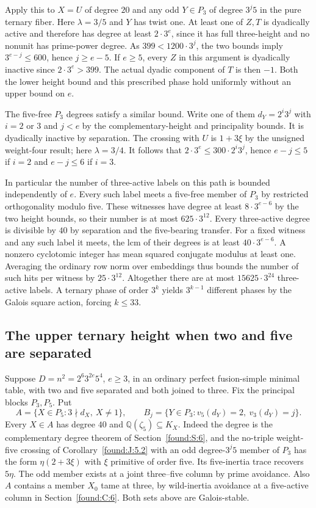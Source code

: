 \documentclass[11pt,a4paper]{article}
\numberwithin{equation}{section}
\theoremstyle{remark}
\newcommand{\QQ}{\mathbb Q}
\begin{document}
Apply this to $X=U$ of degree $20$ and any odd $Y\in P_3$ of
degree $3^j5$ in the pure ternary fiber. Here $\lambda=3/5$ and
$Y$ has twist one. At least one of $Z,T$ is dyadically active and
therefore has degree at least $2\cdot3^e$, since it has full
three-height and no nonunit has prime-power degree. As
$399<1200\cdot3^j$, the two bounds imply
$3^{e-j}\le600$, hence $j\ge e-5$.
If $e\ge5$, every $Z$ in this argument is dyadically inactive
since $2\cdot3^e>399$. The actual dyadic component of $T$ is
then $-1$. Both the lower height bound and this prescribed phase
hold uniformly without an upper bound on $e$.

The five-free $P_3$ degrees satisfy a similar bound. Write one of
them $d_Y=2^i3^j$ with $i=2$ or $3$ and $j<e$ by the
complementary-height and principality bounds. It is dyadically
inactive by separation. The crossing with $U$ is $1+3\xi$ by the
unsigned weight-four result; here $\lambda=3/4$. It follows that
$2\cdot3^e\le300\cdot2^i3^j$, hence $e-j\le5$ if $i=2$ and
$e-j\le6$ if $i=3$.

In particular the number of three-active labels on this path is
bounded independently of $e$. Every such label meets a five-free
member of $P_3$ by restricted orthogonality modulo five.
These witnesses have degree at least $8\cdot3^{e-6}$ by the two
height bounds, so their number is at most $625\cdot3^{12}$.
Every three-active degree is divisible by $40$ by separation and
the five-bearing transfer. For a fixed witness and any such label
it meets, the lcm of their degrees is at least $40\cdot3^{e-6}$.
A nonzero cyclotomic integer has mean squared conjugate modulus at
least one. Averaging the ordinary row norm over embeddings thus
bounds the number of such hits per witness by $25\cdot3^{12}$.
Altogether there are at most $15625\cdot3^{24}$ three-active
labels. A ternary phase of order $3^k$ yields $3^{k-1}$ different
phases by the Galois square action, forcing $k\le33$.

\subsection{The upper ternary height when two and five are separated}\label{found:F:5}
Suppose $D=n^2=2^6 3^{2e}5^4$, $e\ge3$, in an ordinary perfect fusion-simple minimal table, with two and five separated and both joined to three. Fix the principal blocks $P_3,P_5$. Put
\[
 A=\{X\in P_5:3\nmid d_X,\ X\ne1\},\qquad
 B_j=\{Y\in P_3:v_5(d_Y)=2,\ v_3(d_Y)=j\}.
\]
Every $X\in A$ has degree $40$ and $\QQ(\zeta_5)\subseteq K_X$. Indeed the degree is the complementary degree theorem of Section~\ref{found:S:6}, and the no-triple weight-five crossing of Corollary~\ref{found:J:5.2} with an odd degree-$3^j5$ member of $P_3$ has the form $\eta(2+3\xi)$ with $\xi$ primitive of order five. Its five-inertia trace recovers $5\eta$. The odd member exists at a joint three--five column by prime avoidance. Also $A$ contains a member $X_0$ tame at three, by wild-inertia avoidance at a five-active column in Section~\ref{found:C:6}. Both sets above are Galois-stable.
\end{document}
